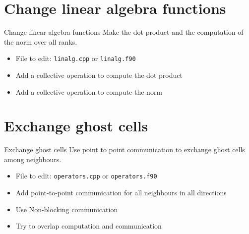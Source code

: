 \documentclass[aspectratio=43]{beamer}
\begin{document}
\section{Change linear algebra functions}
\begin{frame}[fragile]{Change linear algebra functions}
Make the dot product and the computation of the norm over all ranks.
\begin{itemize}
\item File to edit: \verb+linalg.cpp+ or \verb+linalg.f90+
\item Add a collective operation to compute the dot product
\item Add a collective operation to compute the norm
\end{itemize}
\end{frame}

\section{Exchange ghost cells}
\begin{frame}[fragile]{Exchange ghost cells}
Use point to point communication to exchange ghost cells among neighbours.
\begin{itemize}
\item File to edit: \verb+operators.cpp+ or \verb+operators.f90+
\item Add point-to-point communication for all neighbours in all directions
\item Use Non-blocking communication
\item Try to overlap computation and communication
\end{itemize}
\end{frame}

\end{document}
